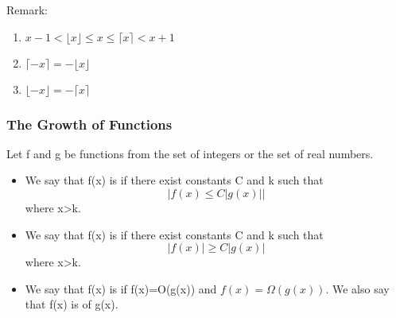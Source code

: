 Remark: 
\begin{enumerate}
    \item $x-1<\lfloor x \rfloor\le x \le \lceil x \rceil < x+1$
    \item $\lceil -x \rceil=-\lfloor x \rfloor$
    \item $\lfloor -x \rfloor=-\lceil x \rceil$
\end{enumerate}

\subsubsection{The Growth of Functions}
\begin{definition}
    Let f and g be functions from the set of integers or the set of  real numbers. 
    \begin{itemize}
        \item We say that f(x) is  if there exist constants C and k such that 
        \[ |f(x)\le C|g(x)||\]
        where x>k. 
        \item We say that f(x) is  if there exist constants C and k such that
        \[ |f(x)|\ge C|g(x)| \]
        where x>k.
        \item We say that f(x) is  if f(x)=O(g(x)) and $f(x)=\Omega (g(x))$. We also say that f(x) is of  g(x). 
    \end{itemize}
\end{definition}
